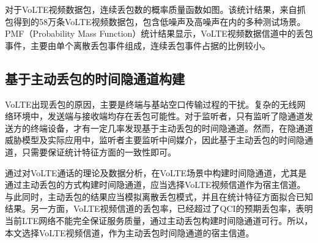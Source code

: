
对于VoLTE视频数据包，连续丢包数的概率质量函数如图。该统计结果，来自抓包得到的58万条VoLTE视频数据包，包含低噪声及高噪声在内的多种测试场景。PMF（Probability Mass Function）统计结果显示，VoLTE视频数据信道中的丢包事件，主要由单个离散丢包事件组成，连续丢包事件占据的比例较小。

\subsection{基于主动丢包的时间隐通道构建}
\label{chap:backinfo:volte:scheme}
VoLTE出现丢包的原因，主要是终端与基站空口传输过程的干扰。复杂的无线网络环境中，发送端与接收端均存在丢包可能性。对于监听者，只有监听了隐通道发送方的终端设备，才有一定几率发现基于主动丢包的时间隐通道。然而，在隐通道威胁模型及实际应用中，监听者主要监听中间媒介，因此基于主动丢包的时间隐通道，只需要保证统计特征方面的一致性即可。

通过对VoLTE通话的理论及数据分析，在VoLTE场景中构建时间隐通道，尤其是通过主动丢包的方式构建时间隐通道，应当选择VoLTE视频信道作为宿主信道。与此同时，主动丢包的结果应当模拟离散丢包模式，并且在统计特征方面拟合已知结果。另一方面，VoLTE视频信道的丢包率，已经超过了QCI的预期丢包率，表明当前LTE网络不能完全保证服务质量，通过主动丢包构建时间隐通道可行。所以，本文选择VoLTE视频信道，作为主动丢包时间隐通道的宿主信道。